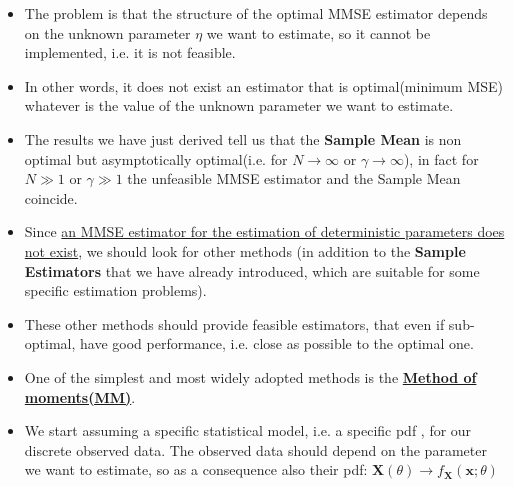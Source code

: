 \begin{itemize}
$$
\frac{d MSE(\alpha)}{d \alpha} = 2\alpha \left( \eta^2 + \frac{\sigma^2}{N} \right) - 2\eta^2 = 0 \implies \alpha = \frac{\eta^2}{\eta^2 + \frac{\sigma^2}{N}} = \frac{1}{1 + \frac{\sigma^2}{N\eta^2}}
$$



    Where \(\gamma\triangleq\frac{\eta^2}{\sigma^2}\) is a sort of SNR.\\
    Note that : \(0\leq \alpha_{MMSE}\leq1\) and \(\lim_{N\hspace{0.2em}or\hspace{0.2em}\gamma\rightarrow+\infty}\alpha_{MMSE}=1\)\\
    In practice if \(N\gg1\) or \(\gamma\gg1\)\(\longrightarrow\alpha_{MMSE}=1\)
$$
\hat{\eta}_{MMSE} = \alpha_{MMSE} \cdot \frac{1}{N} \sum_{i=1}^N X_i
\rightarrow b\left\{ \hat{\eta}_{MMSE} \right\} = E\left\{ \eta - \hat{\eta}_{MMSE} \right\} = \eta - \alpha_{MMSE} \eta
$$

$$
b\left\{ \hat{\eta}_{MMSE} \right\} = (1 - \alpha_{MMSE})\eta =
\left( 1 - \frac{1}{1 + \frac{1}{N\gamma}} \right) \eta = \frac{1}{1 + N\gamma}\eta \quad\quad \eta \neq 0
$$

$$
MMSE = MSE(\alpha_{MMSE}) = \frac{\sigma^2}{N} \cdot \frac{1}{1 + \frac{1}{N\gamma}}
= \alpha_{MMSE} \cdot \frac{\sigma^2}{N} \leq \frac{\sigma^2}{N}
$$


    \item The problem is that the structure of the optimal MMSE estimator depends on the unknown parameter \(\eta\) we want to estimate, so it cannot be implemented, i.e. it is not feasible.
    \item In other words, it does not exist an estimator that is optimal(minimum MSE) whatever is the value of the unknown parameter we want to estimate.
    \item The results we have just derived tell us that the \textbf{Sample Mean} is non optimal but asymptotically optimal(i.e. for \(N\rightarrow\infty\) or \(\gamma\rightarrow\infty\)), in fact for \(N\gg1\) or \(\gamma\gg1\) the unfeasible MMSE estimator and the Sample Mean coincide.
    \item Since \underline{an MMSE estimator for the estimation of deterministic parameters does not exist}, we should look for other methods (in addition to the \textbf{Sample Estimators} that we have already introduced, which are suitable for some specific estimation problems).
    \item These other methods should provide feasible estimators, that even if sub-optimal, have good performance, i.e. close as possible to the optimal one.
    \item One of the simplest and most widely adopted methods is the \underline{\textbf{Method of moments(MM)}}.
    \item We start assuming a specific statistical model, i.e. a specific pdf , for our discrete observed data. The observed data should depend on the parameter we want to estimate, so as a consequence also their pdf: \(\textbf{X}(\theta)\rightarrow f_{\textbf{X}}(\textbf{x};\theta)\)

\end{itemize}
